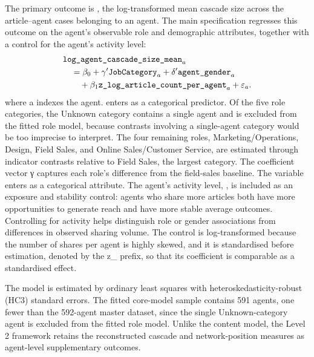 The primary outcome is , the log-transformed mean cascade size across the article–agent cases belonging to an agent. The main specification regresses this outcome on the agent's observable role and demographic attributes, together with a control for the agent's activity level:
{\setlength{\abovedisplayskip}{0pt}
\setlength{\belowdisplayskip}{0.35\baselineskip}
\setlength{\abovedisplayshortskip}{0pt}
\setlength{\belowdisplayshortskip}{0.35\baselineskip}
\begin{equation}
\begin{aligned}
&\varname{log\_agent\_cascade\_size\_mean}_{a} \\
&\quad= \beta_{0}
+ \gamma' \varname{JobCategory}_{a}
+ \delta' \varname{agent\_gender}_{a} \\
&\qquad
+ \beta_{1}\varname{z\_log\_article\_count\_per\_agent}_{a}
+ \varepsilon_{a}.
\end{aligned}
\end{equation}
}
where a indexes the agent.  enters as a categorical predictor. Of the five role categories, the Unknown category contains a single agent and is excluded from the fitted role model, because contrasts involving a single-agent category would be too imprecise to interpret. The four remaining roles, Marketing/Operations, Design, Field Sales, and Online Sales/Customer Service, are estimated through indicator contrasts relative to Field Sales, the largest category. The coefficient vector γ captures each role's difference from the field-sales baseline. The  variable enters as a categorical attribute. The agent's activity level, , is included as an exposure and stability control: agents who share more articles both have more opportunities to generate reach and have more stable average outcomes. Controlling for activity helps distinguish role or gender associations from differences in observed sharing volume. The control is log-transformed because the number of shares per agent is highly skewed, and it is standardised before estimation, denoted by the z\_ prefix, so that its coefficient is comparable as a standardised effect.

The model is estimated by ordinary least squares with heteroskedasticity-robust (HC3) standard errors. The fitted core-model sample contains 591 agents, one fewer than the 592-agent master dataset, since the single Unknown-category agent is excluded from the fitted role model. Unlike the content model, the Level 2 framework retains the reconstructed cascade and network-position measures as agent-level supplementary outcomes.

